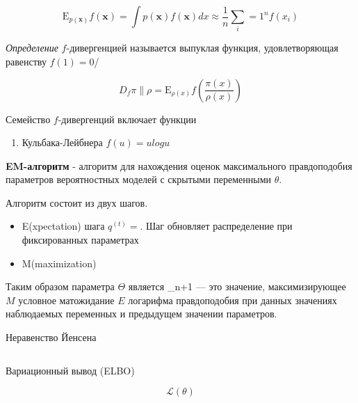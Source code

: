 \begin{equation}
    \mathrm E_{p(\mathbf{x})} f(\mathbf{x}) = \int p(\mathbf{x}) f(\mathbf{x}) dx \approx \frac{1}{n} \sum_i=1^n f(x_i)
\end{equation}


\textit{Определение} $f$-дивергенцией называется выпуклая функция, удовлетворяющая равенству $f(1)=0$/

$$
    D_f{\pi \parallel \rho} = \mathrm E_{\rho(x)} f\left(\frac{\pi(x)}{\rho(x)}\right)
$$

Семейство $f$-дивергенций включает функции \begin{enumerate}
    \item Кульбака-Лейбнера $f(u)=u logu $
\end{enumerate}


 \textbf{EM-алгоритм} - алгоритм для нахождения оценок
максимального правдоподобия параметров 
 вероятностных моделей с скрытыми переменными $\theta$.

Алгоритм состоит из двух шагов. \begin{itemize}
    \item E(xpectation) шага $q^{(t)} = $. Шаг 
    обновляет распределение при фиксированных параметрах
    \item M(maximization)
\end{itemize}

Таким образом параметра $\Theta$ является
{\displaystyle \Theta _{n+1}} — это значение, максимизирующее $M$ условное матожидание $E$ логарифма правдоподобия при данных значениях наблюдаемых переменных и предыдущем значении параметров. 


Неравенство Йенсена 

$$
$$

Вариационный вывод (ELBO)

$$
    \mathcal{L}(\theta)
$$

